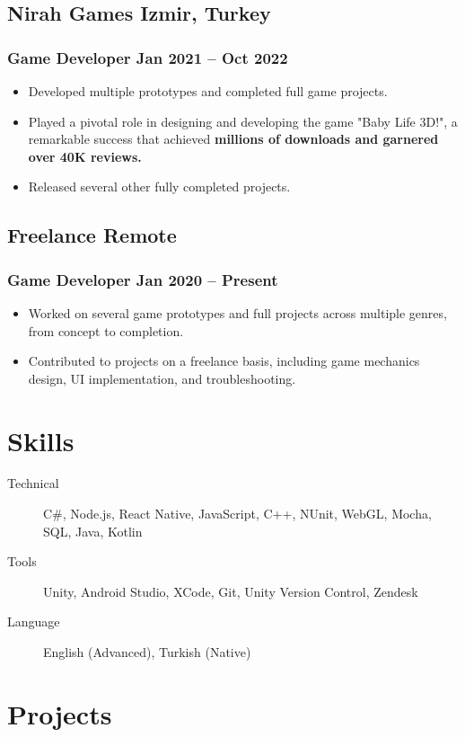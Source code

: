 \documentclass[11pt]{article}
\newcommand{\rside}[1]{
  \hfill {\normalfont\color{accent} #1}%
}
\begin{document}
\subsection{Nirah Games  \rside{Izmir, Turkey}}
\subsubsection{Game Developer \rside{Jan 2021 -- Oct 2022}}
\begin{itemize}
  \item Developed multiple prototypes and completed full game projects.
  \item Played a pivotal role in designing and developing the game "Baby Life 3D!", a remarkable success that achieved \textbf{millions of downloads and garnered over 40K reviews.}
  \item Released several other fully completed projects.
\end{itemize}

\subsection{Freelance \rside{Remote}}
\subsubsection{Game Developer \rside{Jan 2020 -- Present}}
\begin{itemize}
  \item Worked on several game prototypes and full projects across multiple genres, from concept to completion.
  \item Contributed to projects on a freelance basis, including game mechanics design, UI implementation, and troubleshooting.
\end{itemize}
\section{Skills}
\begin{description}
   \item[Technical] C\#, Node.js, React Native, JavaScript, C++, NUnit, WebGL, Mocha, SQL, Java, Kotlin
  \item[Tools] Unity, Android Studio, XCode, Git, Unity Version Control, Zendesk
  \item[Language] English (Advanced), Turkish (Native)
\end{description}
\section{Projects}
\end{document}

